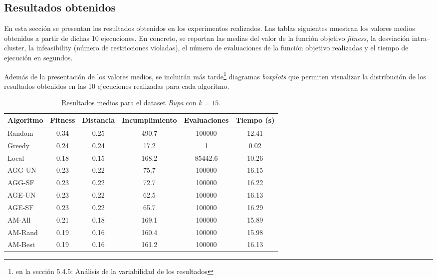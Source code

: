 \documentclass[a4paper,12pt]{article}%
\begin{document}
\subsection{Resultados obtenidos}

\noindent En esta sección se presentan los resultados obtenidos en los experimentos realizados. Las tablas siguientes muestran los valores medios obtenidos a partir de dichas 10 ejecuciones. En concreto, se reportan las medias del valor de la función objetivo \textit{fitness}, la desviación intra--cluster, la infeasibility (número de restricciones violadas), el número de evaluaciones de la función objetivo realizadas y el tiempo de ejecución en segundos.

Además de la presentación de los valores medios, se incluirán más tarde\footnote{en la sección 5.4.5: Análisis de la variabilidad de los resultados} diagramas \textit{boxplots} que permiten visualizar la distribución de los resultados obtenidos en las 10 ejecuciones realizadas para cada algoritmo.


\begin{table}[H]
	\centering
	\begin{tabular}{|l|ccccc|}
		\hline
		Algoritmo & Fitness & Distancia & Incumplimiento & Evaluaciones & Tiempo (s) \\
		\hline
		Random & 0.34 & 0.25 & 490.7 & 100000 & 12.41 \\
		Greedy & 0.24 & 0.24 & 17.2 & 1 & 0.02 \\
		Local  & 0.18 & 0.15 & 168.2 & 85442.6 & 10.26 \\
		AGG-UN & 0.23 & 0.22 & 75.7 & 100000 & 16.15 \\
		AGG-SF & 0.23 & 0.22 & 72.7 & 100000 & 16.22 \\
		AGE-UN & 0.23 & 0.22 & 62.5 & 100000 & 16.13 \\
		AGE-SF & 0.23 & 0.22 & 65.7 & 100000 & 16.29 \\
		AM-All & 0.21 & 0.18 & 169.1 & 100000 & 15.89 \\
		AM-Rand & 0.19 & 0.16 & 160.4 & 100000 & 15.98 \\
		AM-Best & 0.19 & 0.16 & 161.2 & 100000 & 16.13 \\
		\hline
	\end{tabular}
	\caption{Resultados medios para el dataset \textit{Bupa} con $k=15$.}
	\label{tab_bupa15}
\end{table}
\end{document}
